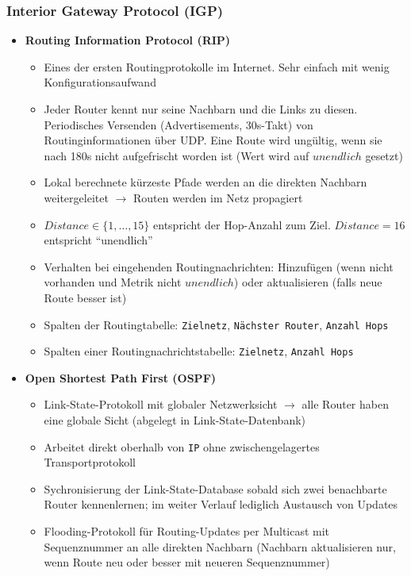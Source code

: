 \subsubsection{Interior Gateway Protocol (IGP)}
\begin{itemize}
	\item \textbf{Routing Information Protocol (RIP)}
	\begin{itemize}
		\item Eines der ersten Routingprotokolle im Internet. Sehr einfach mit wenig Konfigurationsaufwand
		\item Jeder Router kennt nur seine Nachbarn und die Links zu diesen. Periodisches Versenden (Advertisements, 30s-Takt) von Routinginformationen über UDP. Eine Route wird ungültig, wenn sie nach 180s nicht aufgefrischt worden ist (Wert wird auf \(unendlich\) gesetzt)
		\item Lokal berechnete kürzeste Pfade werden an die direkten Nachbarn weitergeleitet \(\rightarrow\) Routen werden im Netz propagiert
		\item \(Distance \in \{1,\dots,15\}\) entspricht der Hop-Anzahl zum Ziel. \(Distance=16\) entspricht "`unendlich"'
		\item Verhalten bei eingehenden Routingnachrichten: Hinzufügen (wenn nicht vorhanden und Metrik nicht \(unendlich\)) oder aktualisieren (falls neue Route besser ist)
		\item Spalten der Routingtabelle: \texttt{Zielnetz}, \texttt{Nächster Router}, \texttt{Anzahl Hops}
		\item Spalten einer Routingnachrichtstabelle: \texttt{Zielnetz}, \texttt{Anzahl Hops}
	\end{itemize}
	\item \textbf{Open Shortest Path First (OSPF)}
	\begin{itemize}
		\item Link-State-Protokoll mit globaler Netzwerksicht \(\rightarrow\) alle Router haben eine globale Sicht (abgelegt in Link-State-Datenbank)
		\item Arbeitet direkt oberhalb von \texttt{IP} ohne zwischengelagertes Transportprotokoll
		\item Sychronisierung der Link-State-Database sobald sich zwei benachbarte Router kennenlernen; im weiter Verlauf lediglich Austausch von Updates
		\item Flooding-Protokoll für Routing-Updates per Multicast mit Sequenznummer an alle direkten Nachbarn (Nachbarn aktualisieren nur, wenn Route neu oder besser mit neueren Sequenznummer)

\end{itemize}
\end{itemize}
